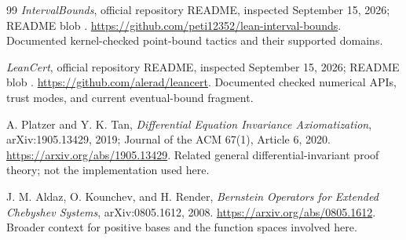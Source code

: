 \begin{thebibliography}{99}
\emph{IntervalBounds}, official repository README, inspected September 15, 2026;
README blob .
\url{https://github.com/peti12352/lean-interval-bounds}.
Documented kernel-checked point-bound tactics and their supported domains.

\emph{LeanCert}, official repository README, inspected September 15, 2026;
README blob .
\url{https://github.com/alerad/leancert}.
Documented checked numerical APIs, trust modes, and current eventual-bound fragment.

A. Platzer and Y. K. Tan, \emph{Differential Equation Invariance Axiomatization},
arXiv:1905.13429, 2019; Journal of the ACM 67(1), Article 6, 2020.
\url{https://arxiv.org/abs/1905.13429}.
Related general differential-invariant proof theory; not the implementation used here.

J. M. Aldaz, O. Kounchev, and H. Render,
\emph{Bernstein Operators for Extended Chebyshev Systems}, arXiv:0805.1612, 2008.
\url{https://arxiv.org/abs/0805.1612}.
Broader context for positive bases and the function spaces involved here.
\end{thebibliography}
